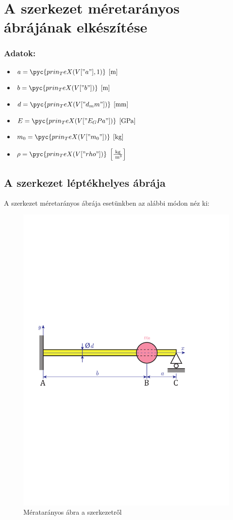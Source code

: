 \documentclass[12pt,a4paper]{article}
\def\m{\; \left[\mathrm{m}\right]}
\def\mili{\; \left[\mathrm{mm}\right]}
\def\Gpa{\; \left[\mathrm{GPa}\right]}
\def\kg{\; \left[\mathrm{kg}\right]}
\def\kgpm{\; \left[\mathrm{\frac{kg}{\; m^3}}\right]}
\begin{document}


\section{A szerkezet méretarányos ábrájának elkészítése}
\subsubsection*{Adatok:}

\begin{multicols}{2}
    \begin{itemize}
        \item $a=\pyc{prin_TeX(V["a"],1)}\m$
        \item $b=\pyc{prin_TeX(V["b"])}\m$
        \item $d=\pyc{prin_TeX(V["d_mm"])}\mili$
    \end{itemize}
    \columnbreak
    \begin{itemize}
        \item $E=\pyc{prin_TeX(V["E_GPa"])} \Gpa$
        \item $m_0=\pyc{prin_TeX(V["m_0"])} \kg$
        \item $\rho=\pyc{prin_TeX(V["rho"])} \kgpm $
    \end{itemize}
\end{multicols}

\subsection{A szerkezet léptékhelyes ábrája}
A szerkezet méretarányos ábrája esetünkben az alábbi módon néz ki:
\begin{figure}[H]
    \centering
    \includegraphics[width=0.8\linewidth]{figures/vem_hf2_abra.pdf}
    \caption{Mératarányos ábra a szerkezetről}
\end{figure}
\end{document}
